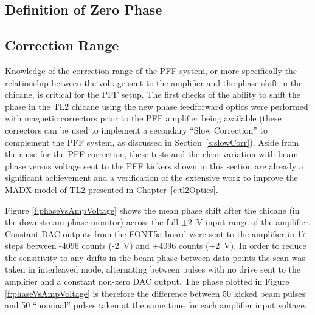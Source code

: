 \subsection{Definition of Zero Phase}
\label{ss:zeroPhase}




\subsection{Correction Range}
\label{ss:corrRange}

Knowledge of the correction range of the PFF system, or more specifically the relationship between the voltage sent to the amplifier and the phase shift in the chicane, is critical for the PFF setup. The first checks of the ability to shift the phase in the TL2 chicane using the new phase feedforward optics were performed with magnetic correctors prior to the PFF amplifier being available (these correctors can be used to implement a secondary ``Slow Correction'' to complement the PFF system, as discussed in Section~\ref{s:slowCorr}). Aside from their use for the PFF correction, these tests and the clear variation with beam phase versus voltage sent to the PFF kickers shown in this section are already a significant achievement and a verification of the extensive work to improve the MADX model of TL2 presented in Chapter~\ref{c:tl2Optics}. 

Figure \ref{f:phaseVsAmpVoltage} shows the mean phase shift after the chicane (in the downstream phase monitor) across the full \(\pm2\)~V input range of the amplifier. Constant DAC outputs from the FONT5a board were sent to the amplifier in 17 steps between -4096 counts (-2~V) and +4096 counts (+2~V). In order to reduce the sensitivity to any drifts in the beam phase between data points the scan was taken in interleaved mode, alternating between pulses with no drive sent to the amplifier and a constant non-zero DAC output. The phase plotted in Figure \ref{f:phaseVsAmpVoltage} is therefore the difference between 50 kicked beam pulses and 50 ``nominal'' pulses taken at the same time for each amplifier input voltage. 

